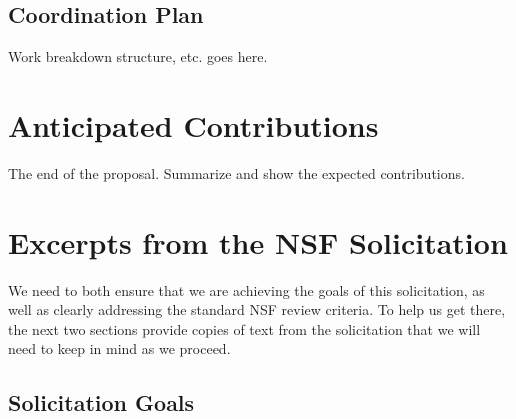 \subsection{Coordination Plan}

Work breakdown structure, etc. goes here. 


\section{Anticipated Contributions}

The end of the proposal.  Summarize and show the expected contributions.

\section{Excerpts from the NSF Solicitation}

We need to both ensure
that we are achieving the goals of this solicitation, as well as clearly
addressing the standard NSF review criteria.  To help us get there, the
next two sections provide copies of text from the solicitation that
we will need to keep in mind as we proceed.

\subsection{Solicitation Goals}
\label{sec:solicitation}

